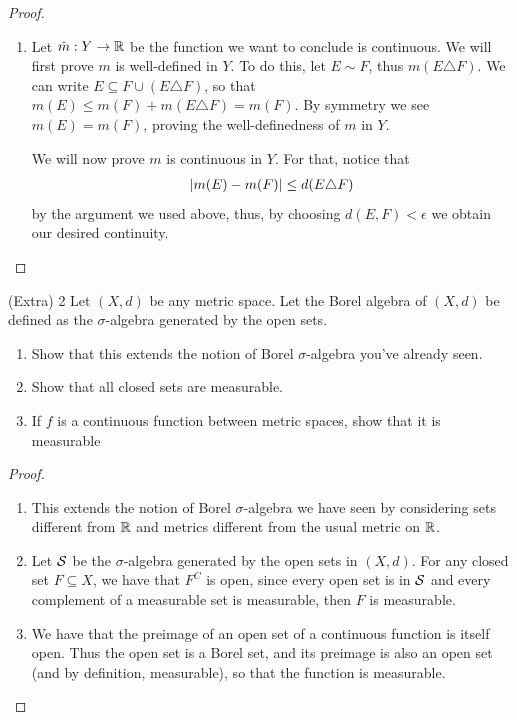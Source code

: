 \begin{proof}
\begin{enumerate}
    \item Let $\tilde{m}: Y \to \mathbb{R}$ be the function we want to conclude is continuous.
    We will first prove $m$ is well-defined in $Y$.
    To do this, let $E \sim F$, thus $m(E \triangle F)$.
    We can write $E \subseteq F \cup (E \triangle F)$, so that $m(E) \leq m(F) + m(E \triangle F) = m(F)$.
    By symmetry we see $m(E) = m(F)$, proving the well-definedness of $m$ in $Y$.
    
    We will now prove $m$ is continuous in $Y$.
    For that, notice that 
    \begin{align*}
        \left\lvert m(E) - m(F)\right\rvert \leq d(E \triangle F)
    \end{align*}
    by the argument we used above, thus, by choosing $d(E, F) < \epsilon$ we obtain our desired continuity.
\end{enumerate}
\end{proof} 

\begin{exercise}{(Extra) 2}
Let $(X,d)$ be any metric space. 
Let the Borel algebra of $(X,d)$ be defined as the $\sigma$-algebra generated by the open sets.
\begin{enumerate}
    \item Show that this extends the notion of Borel $\sigma$-algebra you've already seen.
    \item Show that all closed sets are measurable.
    \item If $f$ is a continuous function between metric spaces, show that it is measurable
\end{enumerate}
\end{exercise}
\begin{proof}
\begin{enumerate}
    \item This extends the notion of Borel $\sigma$-algebra we have seen by considering sets different from $\mathbb{R}$ and metrics different from the usual metric on $\mathbb{R}$.
    \item Let $\mathcal{S}$ be the $\sigma$-algebra generated by the open sets in $(X, d)$.
    For any closed set $F \subseteq X$, we have that $F^C$ is open, since every open set is in $\mathcal{S}$ and every complement of a measurable set is measurable, then $F$ is measurable.
    \item We have that the preimage of an open set of a continuous function is itself open.
    Thus the open set is a Borel set, and its preimage is also an open set (and by definition, measurable), so that the function is measurable.
\end{enumerate}
\end{proof} 
